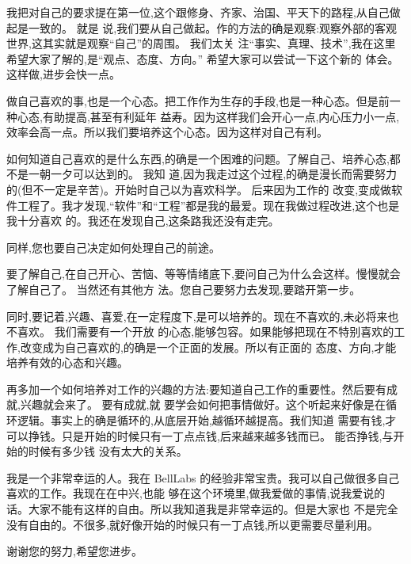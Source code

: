 \documentclass[11pt]{article}
\begin{document}
\begin{yang}

  \ylogo 我把对自己的要求提在第一位,这个跟修身、齐家、治国、平天下的路程,从自己做起是一致的。 就是
  说,我们要从自己做起。作的方法的确是观察:观察外部的客观世界,这其实就是观察``自己''的周围。 我们太关
  注``事实、真理、技术'',我在这里希望大家了解的,是``观点、态度、方向。'' 希望大家可以尝试一下这个新的
  体会。这样做,进步会快一点。

  做自己喜欢的事,也是一个心态。把工作作为生存的手段,也是一种心态。但是前一种心态,有助提高,甚至有利延年
  益寿。因为这样我们会开心一点,内心压力小一点,效率会高一点。所以我们要培养这个心态。因为这样对自己有利。

  如何知道自己喜欢的是什么东西,的确是一个困难的问题。了解自己、培养心态,都不是一朝一夕可以达到的。 我知
  道,因为我走过这个过程,的确是漫长而需要努力的(但不一定是辛苦)。开始时自己以为喜欢科学。 后来因为工作的
  改变,变成做软件工程了。我才发现,``软件''和``工程''都是我的最爱。现在我做过程改进,这个也是我十分喜欢
  的。我还在发现自己,这条路我还没有走完。

  同样,您也要自己决定如何处理自己的前途。

  要了解自己,在自己开心、苦恼、等等情绪底下,要问自己为什么会这样。慢慢就会了解自己了。 当然还有其他方
  法。您自己要努力去发现,要踏开第一步。

  同时,要记着,兴趣、喜爱,在一定程度下,是可以培养的。现在不喜欢的,未必将来也不喜欢。 我们需要有一个开放
  的心态,能够包容。如果能够把现在不特别喜欢的工作,改变成为自己喜欢的,的确是一个正面的发展。所以有正面的
  态度、方向,才能培养有效的心态和兴趣。

  再多加一个如何培养对工作的兴趣的方法:要知道自己工作的重要性。然后要有成就,兴趣就会来了。 要有成就,就
  要学会如何把事情做好。这个听起来好像是在循环逻辑。事实上的确是循环的,从底层开始,越循环越提高。我们知道
  需要有钱,才可以挣钱。只是开始的时候只有一丁点点钱,后来越来越多钱而已。 能否挣钱,与开始的时候有多少钱
  没有太大的关系。

  我是一个非常幸运的人。我在 BellLabs 的经验非常宝贵。我可以自己做很多自己喜欢的工作。我现在在中兴,也能
  够在这个环境里,做我爱做的事情,说我爱说的话。大家不能有这样的自由。所以我知道我是非常幸运的。但是大家也
  不是完全没有自由的。不很多,就好像开始的时候只有一丁点钱,所以更需要尽量利用。

  谢谢您的努力,希望您进步。
\end{yang}
\end{document}
